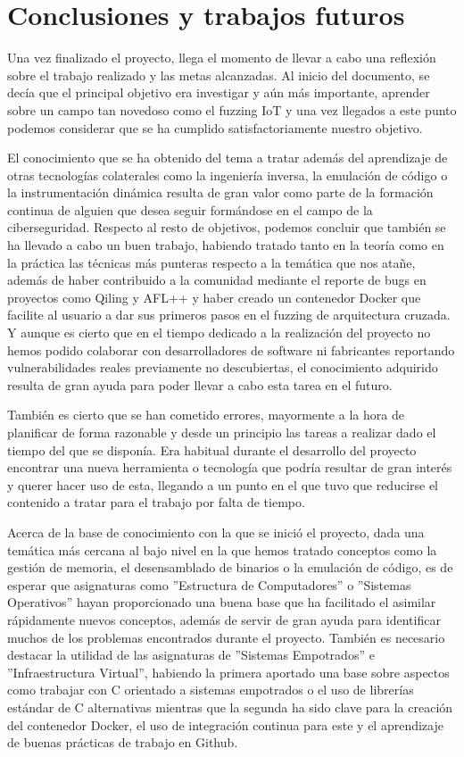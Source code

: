 \chapter{Conclusiones y trabajos futuros}
\label{conclusiones}
Una vez finalizado el proyecto, llega el momento de llevar a cabo una reflexión sobre el trabajo realizado y las metas alcanzadas. Al 
inicio del documento, se decía que el principal objetivo era investigar y aún más importante, aprender sobre un campo tan novedoso como 
el fuzzing IoT y una vez llegados a este punto podemos considerar que se ha cumplido satisfactoriamente nuestro objetivo.\bigskip

El conocimiento 
que se ha obtenido del tema a tratar además del aprendizaje de otras tecnologías colaterales como la ingeniería inversa, la 
emulación de código o la instrumentación dinámica resulta de gran valor como parte de la formación continua de alguien que desea seguir 
formándose en el campo de la ciberseguridad. Respecto al resto de objetivos, podemos concluir que también se ha llevado a cabo un buen
trabajo, habiendo tratado tanto en la teoría como en la práctica las técnicas más punteras respecto a la temática que nos atañe, 
además de haber contribuido a la comunidad mediante el reporte de bugs en proyectos como Qiling y AFL++ y haber creado un contenedor 
Docker que facilite al usuario a dar sus primeros pasos en el fuzzing de arquitectura cruzada. Y aunque es cierto que en el tiempo dedicado
a la realización del proyecto no hemos podido colaborar con desarrolladores de software ni fabricantes reportando vulnerabilidades reales 
previamente no descubiertas, el conocimiento adquirido resulta de gran ayuda para poder llevar a cabo esta tarea en el futuro.\bigskip

También es cierto que se han cometido errores, mayormente a la hora de planificar de forma razonable y desde un principio las tareas a
realizar dado el tiempo del que se disponía. Era habitual durante el desarrollo del proyecto encontrar una nueva herramienta o tecnología que podría 
resultar de gran interés y querer hacer uso de esta, llegando a un punto en el que tuvo que reducirse el contenido a tratar para el trabajo
por falta de tiempo.\bigskip

Acerca de la base de conocimiento con la que se inició el proyecto, dada una temática más cercana al bajo nivel en la que hemos tratado conceptos como la gestión de memoria, el desensamblado
de binarios o la emulación de código, es de esperar que asignaturas como ''Estructura de Computadores'' o ''Sistemas Operativos'' hayan proporcionado una buena base 
que ha facilitado el asimilar rápidamente nuevos conceptos, además de servir de gran ayuda para identificar muchos de los problemas 
encontrados durante el proyecto. También es necesario destacar la utilidad de las asignaturas de ''Sistemas Empotrados'' e
''Infraestructura Virtual'', habiendo la primera aportado una base sobre aspectos como trabajar con C orientado a sistemas empotrados o 
el uso de librerías estándar de C alternativas mientras que la segunda ha sido clave para la creación del contenedor Docker, el uso de 
integración continua para este y el aprendizaje de buenas prácticas de trabajo en Github.\bigskip

